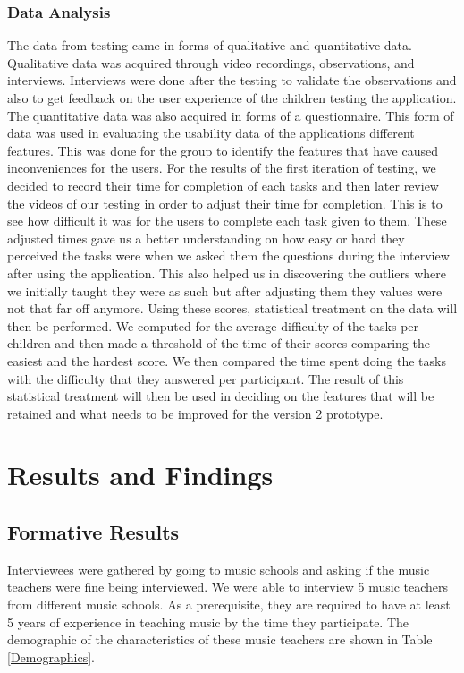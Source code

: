 
\subsubsection{Data Analysis}

The data from testing came in forms of qualitative and quantitative data. Qualitative data was acquired through video recordings, observations, and interviews. Interviews were done after the testing to validate the observations and also to get feedback on the user experience of the children testing the application. The quantitative data was also acquired in forms of a questionnaire. This form of data was used in evaluating the usability data of the applications different features. This was done for the group to identify the features that have caused inconveniences for the users. For the results of the first iteration of testing, we decided to record their time for completion of each tasks and then later review the videos of our testing in order to adjust their time for completion. This is to see how difficult it was for the users to complete each task given to them. These adjusted times gave us a better understanding on how easy or hard they perceived the tasks were when we asked them the questions during the interview after using the application. This also helped us in discovering the outliers where we initially taught they were as such but after adjusting them they values were not that far off anymore. Using these scores, statistical treatment on the data will then be performed. We computed for the average difficulty of the tasks per children and then made a threshold of the time of their scores comparing the easiest and the hardest score. We then compared the time spent doing the tasks with the difficulty that they answered per participant. The result of this statistical treatment will then be used in deciding on the features that will be retained and what needs to be improved for the version 2 prototype. 




\section{Results and Findings}
\subsection{Formative Results}
Interviewees were gathered by going to music schools and asking if the music teachers were fine being interviewed. We were able to interview 5 music teachers from different music schools. As a prerequisite, they are required to have at least 5 years of experience in teaching music by the time they participate. The demographic of the characteristics of these music teachers are shown in Table \ref{Demographics}.


